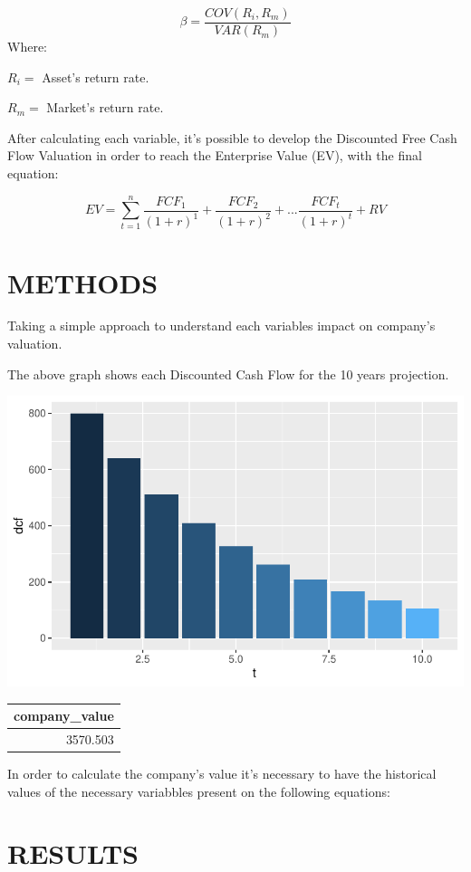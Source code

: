 \documentclass[
  11pt,
  a4paper,
]{article}
\begin{document}
\[\beta = \frac{COV(R_i,R_m)}{VAR(R_m)}\]
Where:

\(R_i =\) Asset's return rate.

\(R_m =\) Market's return rate.

After calculating each variable, it's possible to develop the Discounted Free Cash Flow Valuation in order to reach the Enterprise Value (EV), with the final equation:

\[EV = \sum_{t=1}^n\frac{FCF_1}{(1+r)^1} + \frac{FCF_2}{(1+r)^2} + ... \frac{FCF_t}{(1+r)^t} + RV \]

\hypertarget{methods}{%
\section{METHODS}\label{methods}}

Taking a simple approach to understand each variables impact on company's valuation.

The above graph shows each Discounted Cash Flow for the 10 years projection.

\begin{center}\includegraphics{output/figures/unnamed-chunk-2-1} \end{center}

\begin{tabular}{r}
\hline
company\_value\\
\hline
3570.503\\
\hline
\end{tabular}

In order to calculate the company's value it's necessary to have the historical values of the necessary variabbles present on the following equations:

\hypertarget{results}{%
\section{RESULTS}\label{results}}
\end{document}
